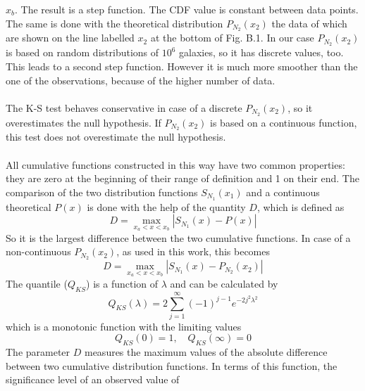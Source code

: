 $x_b$. The result is a step function. The CDF value is constant
between data points. The same is done with the theoretical
distribution $P_{N_2}(x_2)$ the data of which are shown on the
line labelled $x_2$ at the bottom of Fig. B.1. In our case
$P_{N_2}(x_2)$ is based on random distributions of $10^6$
galaxies, so it has discrete values, too. This leads to a second
step function. However it is much more smoother than the one of
the observations, because of the higher number of data.\\\\
The K-S test behaves conservative in case of a discrete
$P_{N_2}(x_2)$, so it overestimates the null hypothesis. If
$P_{N_2}(x_2)$ is based on a continuous function, this test does
not overestimate the null hypothesis.\\\\
All cumulative functions constructed in this way have two common
properties: they are zero at the beginning of their range of
definition and 1 on their end. The comparison of the two
distribution functions $S_{N_1}(x_1)$ and a continuous theoretical
$P(x)$ is done with the help of the quantity $D$, which is defined
as
\begin{equation}
    D=\max_{x_a<x<x_b}|S_{N_1}(x)-P(x)|
\end{equation}
So it is the largest difference between the two cumulative
functions. In case of a non-continuous $P_{N_2}(x_2)$, as used in
this work, this becomes
\begin{equation}
    D=\max_{x_a<x<x_b}|S_{N_1}(x)-P_{N_2}(x_2)|
\end{equation}
The quantile ($Q_{KS}$) is a function of $\lambda$ and can be
calculated by
\begin{equation}\label{k_s}
    Q_{KS}(\lambda)=2\sum_{j=1}^\infty (-1)^{j-1}e^{-2j^2\lambda^2}
\end{equation}
which is a monotonic function with the limiting values
\begin{equation}
    Q_{KS}(0)=1, \quad Q_{KS}(\infty)=0
\end{equation}
The parameter $D$ measures the maximum values of the absolute
difference between two cumulative distribution functions. In terms
of this function, the significance level of an observed value of
